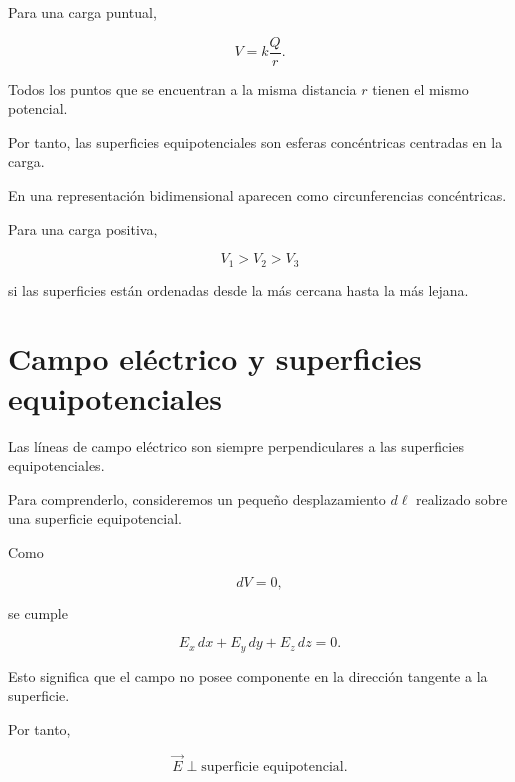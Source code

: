 Para una carga puntual,

\[
V=k\frac{Q}{r}.
\]

Todos los puntos que se encuentran a la misma distancia \(r\) tienen el mismo
potencial.

Por tanto, las superficies equipotenciales son esferas concéntricas centradas en la
carga.

En una representación bidimensional aparecen como circunferencias concéntricas.

\begin{center}
\end{center}

Para una carga positiva,

\[
V_1>V_2>V_3
\]

si las superficies están ordenadas desde la más cercana hasta la más lejana.


\section{Campo eléctrico y superficies equipotenciales}

Las líneas de campo eléctrico son siempre perpendiculares a las superficies
equipotenciales.

Para comprenderlo, consideremos un pequeño desplazamiento \(d\ell\) realizado sobre
una superficie equipotencial.

Como

\[
dV=0,
\]

se cumple

\[
E_x\,dx+E_y\,dy+E_z\,dz=0.
\]

Esto significa que el campo no posee componente en la dirección tangente a la
superficie.

Por tanto,

\begin{equation}
\boxed{
\vec E\perp\text{superficie equipotencial}
}.
\end{equation}

